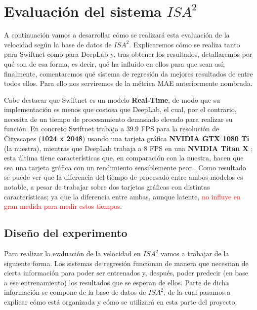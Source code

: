 \section{Evaluación del sistema $ISA^{2}$}

A continuación vamos a desarrollar cómo se realizará esta evaluación de la velocidad según la base de datos de $ISA^{2}$. Explicaremos cómo se realiza tanto para Swiftnet como para DeepLab y, tras obtener los resultados, detallaremos por qué son de esa forma, es decir, qué ha influido en ellos para que sean así; finalmente, comentaremos qué sistema de regresión da mejores resultados de entre todos ellos. Para ello nos serviremos de la métrica \ac{MAE} anteriormente nombrada.

Cabe destacar que Swiftnet \cite{swiftnet} es un modelo \textbf{Real-Time}, de modo que su implementación es menos que costosa que DeepLab, el cual, por el contrario, necesita de un tiempo de procesamiento demasiado elevado para realizar su función. En concreto Swiftnet trabaja a 39.9 \ac{FPS} para la resolución de Cityscapes (\textbf{1024 x 2048}) usando una tarjeta gráfica \textbf{NVIDIA GTX 1080 Ti} (la nuestra), mientras que DeepLab trabaja a 8 \ac{FPS} en una \textbf{NVIDIA Titan X} \cite{deeplab}; esta última tiene características que, en comparación con la nuestra, hacen que sea una tarjeta gráfica con un rendimiento sensiblemente peor \cite{gtx_titan}. Como resultado se puede ver que la diferencia del tiempo de procesado entre ambos modelos es notable, a pesar de trabajar sobre dos tarjetas gráficas con distintas características; ya que la diferencia entre ambas, aunque latente, \textcolor{red}{no influye en gran medida para medir estos tiempos}. %

\subsection{Diseño del experimento}

Para realizar la evaluación de la velocidad en $ISA^{2}$ vamos a trabajar de la siguiente forma. Los sistemas de regresión funcionan de manera que necesitan de cierta información para poder ser entrenados y, después, poder predecir (en base a ese entrenamiento) los resultados que se esperan de ellos. Parte de dicha información se compone de la base de datos de $ISA^{2}$, de la cual pasamos a explicar cómo está organizada y cómo se utilizará en esta parte del proyecto.

